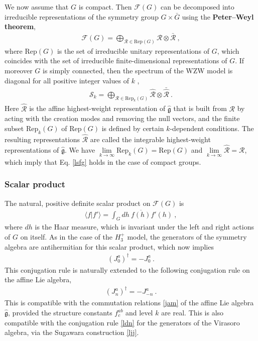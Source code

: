 \documentclass[12pt, a4paper, notitlepage, twoside]{report}
\numberwithin{equation}{section}
\theoremstyle{break}
\begin{document}
We now assume that $G$ is compact.
Then $\mathcal{F}(G)$ can be decomposed into irreducible representations of the symmetry group $G\times \bar{G}$ using the \textbf{\boldmath Peter--Weyl theorem}, 
\begin{align}
 \mathcal{F}(G) = \bigoplus_{\mathcal{R}\in \text{Rep}(G)} \mathcal{R}\otimes \bar{\mathcal{R}}\ ,
\end{align}
where $\text{Rep}(G)$ is the set of irreducible unitary representations of $G$, which coincides with the set of irreducible finite-dimensional representations of $G$.
If moreover $G$ is simply connected, then the spectrum of the WZW model is diagonal for all positive integer values of $k$ \cite{fms97},
\begin{align}
 \mathcal{S}_k = \bigoplus_{\mathcal{R}\in \text{Rep}_k(G)} \hat{\mathcal{R}}\otimes \bar{\hat{\mathcal{R}}}\ .
\end{align}
Here $\hat{\mathcal{R}}$ is the affine highest-weight representation of $\hat{\mathfrak{g}}$ that is built from $\mathcal{R}$ by acting with the creation modes and removing the null vectors, and the finite subset $\text{Rep}_k(G)$ of $\text{Rep}(G)$ is defined by certain $k$-dependent conditions.
The resulting representations $\hat{\mathcal{R}}$ are called the integrable highest-weight representations of $\hat{\mathfrak{g}}$. 
We have $\underset{k\to\infty}{\lim} \text{Rep}_k(G) =\text{Rep}(G)$ and $\underset{k\to \infty}{\lim} \hat{\mathcal{R}} = \mathcal{R}$, which imply that Eq. \eqref{lsfg} holds in the case of compact groups.

\subsubsection{Scalar product}

The natural, positive definite scalar product on $\mathcal{F}(G)$ is 
\begin{align}
 \langle f|f'\rangle = \int_G dh\ \overline{f(h)} f'(h)\ ,
\label{gbg}
\end{align}
where $dh$ is the Haar measure, which is invariant under the left and right actions of $G$ on itself.
As in the case of the $H_3^+$ model, the generators of the symmetry algebra are antihermitian for this scalar product, which now implies
\begin{align}
 (J^a_0)^\dagger = -J^a_0\  . 
\label{jzdj}
\end{align}
This conjugation rule is naturally extended to the following conjugation rule on the affine Lie algebra,
\begin{align}
 \boxed{(J^a_n)^\dagger = -J^a_{-n}}\ .
\end{align}
This is compatible with the commutation relations \eqref{jam} of the affine Lie algebra $\hat{\mathfrak{g}}$, provided the structure constants $f^{ab}_c$ and level $k$ are real.
This is also compatible with the conjugation rule \eqref{ldn} for the generators of the Virasoro algebra, via the Sugawara construction \eqref{ljj}.
\end{document}

